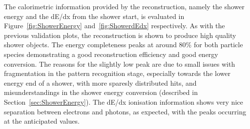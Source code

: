 The calorimetric information provided by the reconstruction, namely the shower energy and the dE/dx from the shower start, is evaluated in Figure~\ref{fig:ShowerEnergy} and~\ref{fig:ShowerdEdx} respectively.  As with the previous validation plots, the reconstruction is shown to produce high quality shower objects.  The energy completeness peaks at around 80\% for both particle species demonstrating a good reconstruction efficiency and good energy conversion.  The reasons for the slightly low peak are due to small issues with fragmentation in the pattern recognition stage, especially towards the lower energy end of a shower, with more sparesly distributed hits, and misunderstandings in the shower energy conversion (described in Section~\ref{sec:ShowerEnergy}).  The dE/dx ionisation information shows very nice separation between electrons and photons, as expected, with the peaks occurring at the anticipated values.

